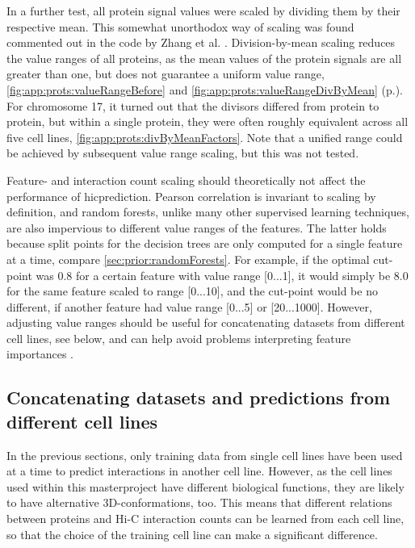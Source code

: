 In a further test, all protein signal values were scaled by dividing them by their respective mean.
This somewhat unorthodox way of scaling was found commented out in the code by Zhang et al. \cite{Roy2020}.
Division-by-mean scaling reduces the value ranges of all proteins, 
as the mean values of the protein signals are all greater than one,
but does not guarantee a uniform value range, 
\autoref{fig:app:prots:valueRangeBefore} and \ref{fig:app:prots:valueRangeDivByMean} (p.\;\pageref{fig:app:prots:valueRangeBefore}).
For chromosome 17, it turned out that the divisors differed from protein to protein, 
but within a single protein, they were often roughly equivalent across all five cell lines, \autoref{fig:app:prots:divByMeanFactors}.
Note that a unified range could be achieved by subsequent value range scaling, but this was not tested.

Feature- and interaction count scaling should theoretically not affect the performance of hicprediction.
Pearson correlation is invariant to scaling by definition,
and random forests, unlike many other supervised learning techniques, are also impervious to different value ranges of the features.
The latter holds because split points for the decision trees are only computed for a single feature at a time, 
compare \autoref{sec:prior:randomForests}.
For example, if the optimal cut-point was 0.8 for a certain feature with value range [0...1],
it would simply be 8.0 for the same feature scaled to range [0...10], 
and the cut-point would be no different, if another feature had value range [0...5] or [20...1000].
However, adjusting value ranges should be useful
for concatenating datasets from different cell lines, see below, and can
help avoid problems interpreting feature importances \cite{Strobl2007}.

\subsection{Concatenating datasets and predictions from different cell lines} \label{sec:improve:concatdatasets}
In the previous sections, only training data from single cell lines have been used at a time 
to predict interactions in another cell line.
However, as the cell lines used within this masterproject have different biological functions, 
they are likely to have alternative 3D-conformations, too.
This means that different relations between proteins and Hi-C interaction counts
can be learned from each cell line, so that the choice of the training cell line can make a significant difference.

